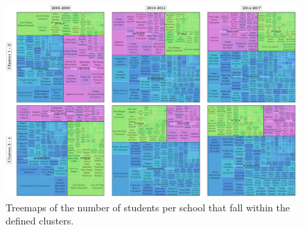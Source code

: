 \documentclass[5p,authoryear,preprint,12pt]{elsarticle}
\begin{document}
\begin{landscape}
	\begin{figure}
		\includegraphics[trim={0cm 0cm 0cm 0cm},clip,scale=0.42]{treemap_VF2}
		\caption{Treemaps of the number of students per school that fall within the defined clusters.}
		\label{treemap}
	\end{figure}
\end{landscape}	




\newpage
\onecolumn
\end{document}
